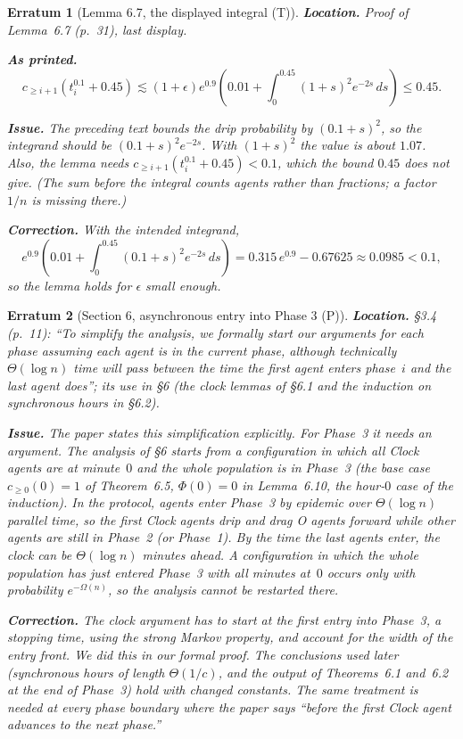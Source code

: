 \documentclass[11pt]{article}
\theoremstyle{erratumstyle}
\newtheorem{erratum}{Erratum}
\begin{document}
\begin{erratum}[Lemma 6.7, the displayed integral (T)]
\textbf{Location.} Proof of Lemma~6.7 (p.~31), last display.

\medskip
\textbf{As printed.}
\[
  c_{\ge i+1}(t^{0.1}_i+0.45)\lesssim(1+\epsilon)e^{0.9}
  \left(0.01+\int_0^{0.45}(1+s)^2e^{-2s}\,ds\right)\le0.45 .
\]

\medskip
\textbf{Issue.} The preceding text bounds the drip probability by
$(0.1+s)^2$, so the integrand should be $(0.1+s)^2e^{-2s}$. With $(1+s)^2$
the value is about $1.07$. Also, the lemma needs
$c_{\ge i+1}(t^{0.1}_i+0.45)<0.1$, which the bound $0.45$ does not give.
(The sum before the integral counts agents rather than fractions; a factor
$1/n$ is missing there.)

\medskip
\textbf{Correction.} With the intended integrand,
\[
  e^{0.9}\left(0.01+\int_0^{0.45}(0.1+s)^2e^{-2s}\,ds\right)
  =0.315\,e^{0.9}-0.67625\approx0.0985<0.1,
\]
so the lemma holds for $\epsilon$ small enough.
\end{erratum}

\begin{erratum}[Section 6, asynchronous entry into Phase 3 (P)]
\textbf{Location.} \S3.4 (p.~11): ``To simplify the analysis, we formally
start our arguments for each phase assuming each agent is in the current
phase, although technically $\Theta(\log n)$ time will pass between the time
the first agent enters phase~$i$ and the last agent does''; its use in \S6
(the clock lemmas of \S6.1 and the induction on synchronous hours in \S6.2).

\medskip
\textbf{Issue.} The paper states this simplification explicitly. For
Phase~3 it needs an argument. The analysis of \S6 starts from a
configuration in which all Clock agents are at minute~$0$ and the whole
population is in Phase~3 (the base case $c_{\ge0}(0)=1$ of Theorem~6.5,
$\Phi(0)=0$ in Lemma~6.10, the hour-$0$ case of the induction). In the
protocol, agents enter Phase~3 by epidemic over $\Theta(\log n)$ parallel
time, so the first Clock agents drip and drag O agents forward while other
agents are still in Phase~2 (or Phase~1). By the time the last agents enter,
the clock can be $\Theta(\log n)$ minutes ahead. A configuration in which the
whole population has just entered Phase~3 with all minutes at~$0$ occurs only
with probability $e^{-\Omega(n)}$, so the analysis cannot be restarted there.

\medskip
\textbf{Correction.} The clock argument has to start at the first entry into
Phase~3, a stopping time, using the strong Markov property, and account for
the width of the entry front. We did this in our formal proof. The
conclusions used later (synchronous hours of length $\Theta(1/c)$, and the
output of Theorems~6.1 and~6.2 at the end of Phase~3) hold with changed
constants. The same treatment is needed at every phase boundary where the
paper says ``before the first Clock agent advances to the next phase.''
\end{erratum}
\end{document}
